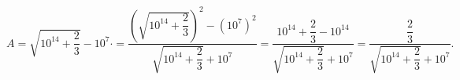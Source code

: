 \begin{frame}
\begin{solution}
\begin{enumerate}[a)]
			      \begin{equation*}
				      A=
				      \sqrt{10^{14}+\dfrac{2}{3}}-10^{7}\cdot
				      =
				      \dfrac{
				      \left(
				      \sqrt{10^{14}+\dfrac{2}{3}}
				      \right)^{2}
				      -{\left(
				      10^{7}
				      \right)}^{2}
				      }{
				      \sqrt{10^{14}+\dfrac{2}{3}}+10^{7}
				      }
				      =
				      \dfrac{
				      10^{14}+\dfrac{2}{3}-10^{14}
				      }{
				      \sqrt{10^{14}+\dfrac{2}{3}}+10^{7}
				      }=
				      \dfrac{\dfrac{2}{3}}{
				      \sqrt{10^{14}+\dfrac{2}{3}}+10^{7}
				      }.
			      \end{equation*}
		\end{enumerate}
	\end{solution}
\end{frame}
